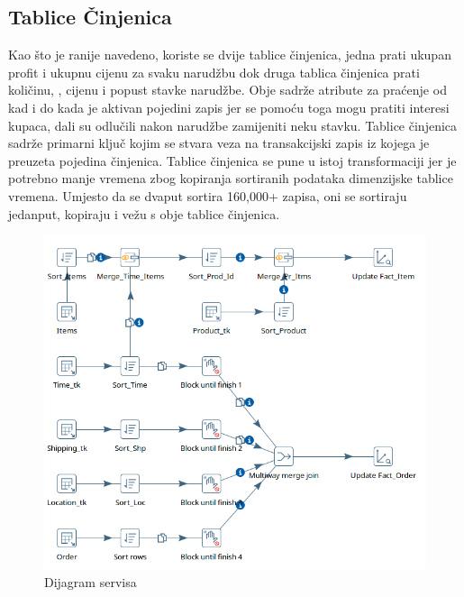 \documentclass[12pt, oneside]{book}
\begin{document}
\vspace{5cm}

\subsection{Tablice Činjenica}
Kao što je ranije navedeno, koriste se dvije tablice činjenica, jedna prati ukupan profit i ukupnu cijenu za svaku narudžbu dok druga tablica činjenica prati količinu, , cijenu i popust stavke narudžbe. Obje sadrže atribute za praćenje od kad i do kada je aktivan pojedini zapis jer se pomoću toga mogu pratiti interesi kupaca, dali su odlučili nakon narudžbe zamijeniti neku stavku. Tablice činjenica sadrže primarni ključ kojim se stvara veza na transakcijski zapis iz kojega je preuzeta pojedina činjenica. Tablice činjenica se pune u istoj transformaciji jer je potrebno manje vremena zbog kopiranja sortiranih podataka dimenzijske tablice vremena. Umjesto da se dvaput sortira 160,000+ zapisa, oni se sortiraju jedanput, kopiraju i vežu s obje tablice činjenica.  



\begin{figure}[H]
\includegraphics[width=16cm]{images/i06_Pentaho-Facts.png}
\centering
\caption{Dijagram servisa}
\end{figure}

\vspace{10cm}
\end{document}
